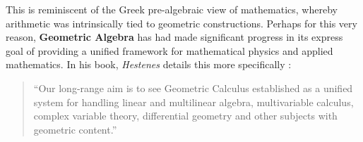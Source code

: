 This is reminiscent of the Greek pre-algebraic view of mathematics, whereby arithmetic was intrinsically tied to geometric constructions.
Perhaps for this very reason, \textbf{Geometric Algebra} has had made significant progress in its express goal of providing a unified framework for mathematical physics and applied mathematics. In his book, \textit{Hestenes} details this more specifically \cite[p. ix]{ga-origin}:

\begin{quote}
	``Our long-range aim is to see Geometric Calculus established as a unified system for handling linear and multilinear algebra, multivariable calculus, complex variable theory, differential geometry and other subjects with geometric content.''
\end{quote}
